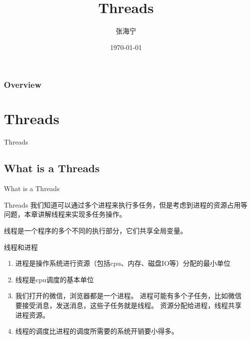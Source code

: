 \documentclass{beamer}
\title[Threads]{Threads} %
\author{张海宁} %
\institute[计算机科学与技术学院] %
{
贵州大学 \\ %
\medskip
\textit{hnzhang1@gzu.edu.cn} %
}
\date{\today} %
\begin{document}
\begin{frame}
\titlepage %
\end{frame}

\begin{frame}
\frametitle{Overview} %
\tableofcontents %
\end{frame}

\section{Threads}
\begin{frame}
\Huge{\centerline{Threads}}
\end{frame}
\subsection{What is a Threads}
\begin{frame}
\Huge{\centerline{What is a Threads}}
\end{frame}
\begin{frame}{Threads}
我们知道可以通过多个进程来执行多任务，但是考虑到进程的资源占用等问题，本章讲解线程来实现多任务操作。

线程是一个程序的多个不同的执行部分，它们共享全局变量。

\end{frame}
\begin{frame}{线程和进程}
\begin{enumerate}
\item
进程是操作系统进行资源（包括cpu、内存、磁盘IO等）分配的最小单位
\item
线程是cpu调度的基本单位
\item
我们打开的微信，浏览器都是一个进程。
进程可能有多个子任务，比如微信要接受消息，发送消息，这些子任务就是线程。
资源分配给进程，线程共享进程资源。
\item
线程的调度比进程的调度所需要的系统开销要小得多。
\end{enumerate}
\end{frame}
\end{document}
